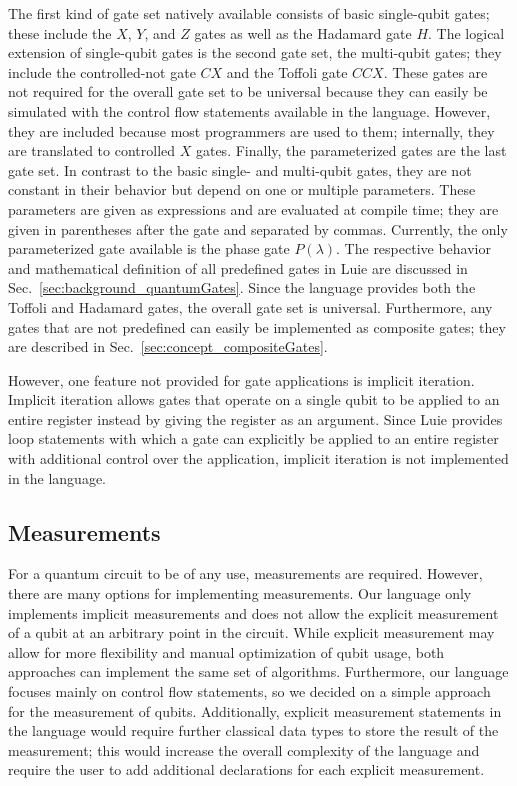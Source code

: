 The first kind of gate set natively available consists of basic single-qubit gates; these include the $X$, $Y$, and $Z$ gates as well as the Hadamard gate $H$. The logical extension of single-qubit gates is the second gate set, the multi-qubit gates; they include the controlled-not gate $CX$ and the Toffoli gate $CCX$. These gates are not required for the overall gate set to be universal because they can easily be simulated with the control flow statements available in the language. However, they are included because most programmers are used to them; internally, they are translated to controlled $X$ gates.
Finally, the parameterized gates are the last gate set. In contrast to the basic single- and multi-qubit gates, they are not constant in their behavior but depend on one or multiple parameters. These parameters are given as expressions and are evaluated at compile time; they are given in parentheses after the gate and separated by commas. Currently, the only parameterized gate available is the phase gate $P(\lambda)$.
The respective behavior and mathematical definition of all predefined gates in Luie are discussed in Sec.~\ref{sec:background_quantumGates}. Since the language provides both the Toffoli and Hadamard gates, the overall gate set is universal. Furthermore, any gates that are not predefined can easily be implemented as composite gates; they are described in Sec.~\ref{sec:concept_compositeGates}.

However, one feature not provided for gate applications is implicit iteration. Implicit iteration allows gates that operate on a single qubit to be applied to an entire register instead by giving the register as an argument. Since Luie provides loop statements with which a gate can explicitly be applied to an entire register with additional control over the application, implicit iteration is not implemented in the language.

\subsection{Measurements}
\label{sec:concept_measurement}
For a quantum circuit to be of any use, measurements are required. However, there are many options for implementing measurements. Our language only implements implicit measurements and does not allow the explicit measurement of a qubit at an arbitrary point in the circuit. While explicit measurement may allow for more flexibility and manual optimization of qubit usage, both approaches can implement the same set of algorithms. Furthermore, our language focuses mainly on control flow statements, so we decided on a simple approach for the measurement of qubits. Additionally, explicit measurement statements in the language would require further classical data types to store the result of the measurement; this would increase the overall complexity of the language and require the user to add additional declarations for each explicit measurement.

